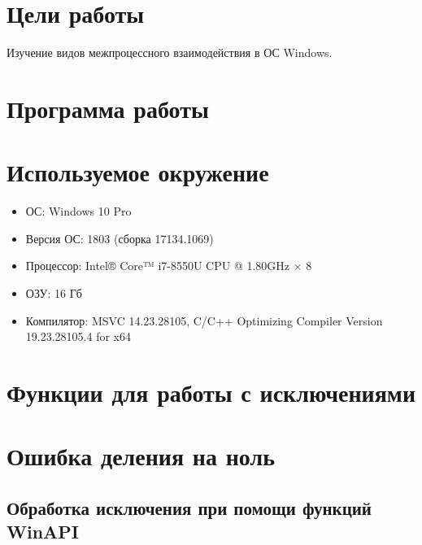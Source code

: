 





\tableofcontents
\newpage

\section{Цели работы}

Изучение видов межпроцессного взаимодействия в ОС Windows.

\section{Программа работы}



\section{Используемое окружение}

\begin{itemize}
	\item ОС: Windows 10 Pro
	\item Версия ОС: 1803 (сборка 17134.1069)
	\item Процессор: Intel® Core™ i7-8550U CPU @ 1.80GHz × 8
	\item ОЗУ: 16 Гб
	\item Компилятор: MSVC 14.23.28105, C/C++ Optimizing Compiler Version 19.23.28105.4 for x64
\end{itemize}

\section{Функции для работы с исключениями}





\section{Ошибка деления на ноль}

\subsection{Обработка исключения при помощи функций WinAPI}

